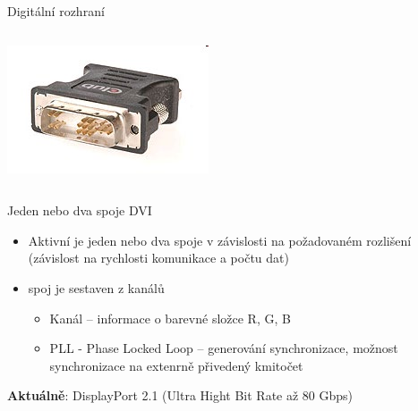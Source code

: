 \documentclass[aspectratio=43]{beamer}
\begin{document}
\begin{frame}{Digitální rozhraní}
\begin{columns}
\begin{center}
			\includegraphics[width=1\linewidth]{extrahovane_obrazky/img_5_page5_2.jpeg}
		\end{center}
	\end{columns}
	
\end{frame}

\begin{frame}{Jeden nebo dva spoje DVI}
	\begin{itemize}
		\item Aktivní je jeden nebo dva spoje v závislosti na požadovaném rozlišení (závislost na rychlosti komunikace a počtu dat)
		\item spoj je sestaven z kanálů
		      \begin{itemize}
		      	\item Kanál – informace o barevné složce R, G, B
		      	\item PLL - Phase Locked Loop – generování synchronizace, možnost synchronizace na extenrně přivedený kmitočet
		      \end{itemize}
	\end{itemize}
	\textbf{Aktuálně}: DisplayPort 2.1 (Ultra Hight Bit Rate až 80 Gbps)
\end{frame}
\end{document}

